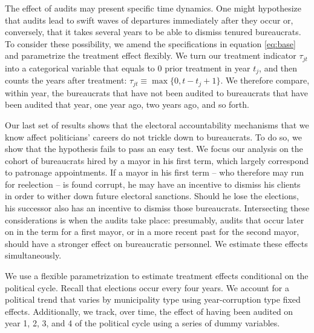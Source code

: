 The effect of audits may present specific time dynamics. One might hypothesize that audits lead to swift waves of departures immediately after they occur or, conversely, that it takes several years to be able to dismiss tenured bureaucrats. To consider these possibility, we amend the specifications in equation \ref{eq:base} and parametrize the treatment effect flexibly. We turn our treatment indicator $\tau_{jt}$ into a categorical variable that equals to 0 prior treatment in year $t_j$, and then counts the years after treatment: $\tau_{jt} \equiv \max\{0, t - t_j + 1\}$. We therefore compare, within year, the bureaucrats that have not been audited to bureaucrats that have been audited that year, one year ago, two years ago, and so forth. 

Our last set of results shows that the electoral accountability mechanisms that we know affect politicians' careers do not trickle down to bureaucrats. To do so, we show that the hypothesis fails to pass an easy test. We focus our analysis on the cohort of bureaucrats hired by a mayor in his first term, which largely correspond to patronage appointments. If a mayor in his first term -- who therefore may run for reelection -- is found corrupt, he may have an incentive to dismiss his clients in order to wither down future electoral sanctions. Should he lose the elections, his successor also has an incentive to dismiss those bureaucrats. Intersecting these considerations is when the audits take place: presumably, audits that occur later on in the term for a first mayor, or in a more recent past for the second mayor, should have a stronger effect on bureaucratic personnel. We estimate these effects simultaneously.

We use a flexible parametrization to estimate treatment effects conditional on the political cycle. Recall that elections occur every four years. We account for a political trend that varies by municipality type using year-corruption type fixed effects. Additionally, we track, over time, the effect of having been audited on year 1, 2, 3, and 4 of the political cycle using a series of dummy variables. 

